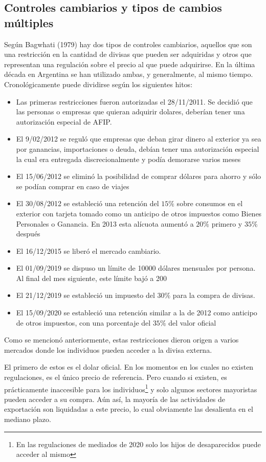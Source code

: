 \documentclass[11pt,a4paper]{article}
\begin{document}
\subsection{Controles cambiarios y tipos de cambios múltiples}
Según Bagwhati (1979) hay dos tipos de controles cambiarios, aquellos que son una restricción en la cantidad de divisas que pueden ser adquiridas y otros que representan una regulación sobre el precio al que puede adquirirse. En la última década en Argentina se han utilizado ambas, y generalmente, al mismo tiempo. Cronológicamente puede dividirse según los siguientes hitos:
\begin{itemize}
\item Las primeras restricciones fueron autorizadas el 28/11/2011. Se decidió que las personas o empresas que quieran adquirir dolares, deberían tener una autorización especial de AFIP.
\item El 9/02/2012 se reguló que empresas que deban girar dinero al exterior ya sea por ganancias, importaciones o deuda, debían tener una autorización especial la cual era entregada discrecionalmente y podía demorarse varios meses 
\item El 15/06/2012 se eliminó la posibilidad de comprar dólares para ahorro y sólo se podían comprar en caso de viajes
\item El 30/08/2012 se estableció una retención del $15 \% $ sobre consumos en el exterior con tarjeta tomado como un anticipo de otros impuestos como Bienes Personales o Ganancia. En 2013 esta alícuota aumentó a $20 \% $ primero y $35 \% $ después
\item El 16/12/2015 se liberó el mercado cambiario.
\item El 01/09/2019 se dispuso un límite de 10000 dólares mensuales por persona. Al final del mes siguiente, este límite bajó a 200
\item El 21/12/2019 se estableció un impuesto del $30 \% $ para la compra de divisas. 
\item El 15/09/2020 se estableció una retención similar a la de 2012 como anticipo de otros impuestos, con una porcentaje del $35 \% $ del valor oficial
\end{itemize}
Como se mencionó anteriormente, estas restricciones dieron origen a varios mercados donde los individuos pueden acceder a la divisa externa.

El primero de estos es el dolar oficial. En los momentos en los cuales no existen regulaciones, es el único precio de referencia. Pero cuando si existen, es prácticamente inaccesible para los individuos\footnote{En las regulaciones de mediados de 2020 solo los hijos de desaparecidos puede acceder al mismo} y solo algunos sectores mayoristas pueden acceder a su compra. Aún así, la mayoría de las actividades de exportación son liquidadas a este precio, lo cual obviamente las desalienta en el mediano plazo.
\end{document}
